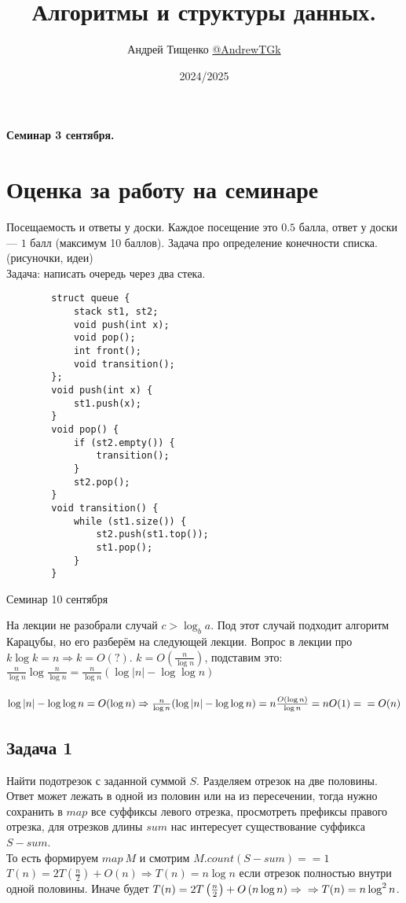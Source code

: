 \documentclass[12pt, a4paper]{article}
\title{Алгоритмы и структуры данных.}
\author{Андрей Тищенко \href{https://t.me/AndrewTGk}{@AndrewTGk}}
\date{2024/2025}
\begin{document}
    \maketitle
    \begin{center}
        \textbf{Семинар 3 сентября.}
    \end{center}
    \section*{Оценка за работу на семинаре}
    Посещаемость и ответы у доски. Каждое посещение это $0.5$ балла, ответ у доски --- $1$ балл (максимум 10 баллов).
    Задача про определение конечности списка. (рисуночки, идеи)\\
    Задача: написать очередь через два стека.
    \begin{lstlisting}
        struct queue {
            stack st1, st2;
            void push(int x);
            void pop();
            int front();
            void transition();
        };
        void push(int x) {
            st1.push(x);
        }
        void pop() {
            if (st2.empty()) {
                transition();
            }
            st2.pop();
        }
        void transition() {
            while (st1.size()) {
                st2.push(st1.top());
                st1.pop();
            }
        }
    \end{lstlisting}
    \begin{center}
        Семинар 10 сентября
    \end{center}
    На лекции не разобрали случай $c > \log_b a$. Под этот случай подходит алгоритм Карацубы, но его 
    разберём на следующей лекции.
    Вопрос в лекции про $k\log k = n\Rightarrow k = O(?)$. $k = O\left(\frac{n}{\log n}\right)$, подставим это:\\
    $\frac{n}{\log n} \log \frac{n}{\log n} = \frac{n}{\log n}(\log |n| - \log\log n)$\\\
    $\log |n| - \log\log n = O(\log n)\Rightarrow \frac{n}{\log n}(\log |n| - \log\log n) = n\frac{O(\log n)}{\log n} = nO(1) =\\
    = O(n)$
    \subsection*{Задача 1}
    Найти подотрезок с заданной суммой $S$. Разделяем отрезок на две половины.\\
    Ответ может лежать в одной из половин или на из пересечении, тогда нужно сохранить в 
    $map$ все суффиксы левого отрезка, просмотреть префиксы правого отрезка, для отрезков длины $sum$
    нас интересует существование суффикса $S - sum$.\\
    То есть формируем $map\ M$ и смотрим $M.count(S - sum) == 1$\\
    $T(n) = 2T\left(\frac{n}{2} \right) + O\left(n\right)\Rightarrow T(n) = n\log n$ если отрезок полностью внутри одной половины.
    Иначе будет $T(n) = 2T\left(\frac{n}{2} \right) + O\left(n\log n\right)\Rightarrow\\
    \Rightarrow  T(n) = n\log^2 n$.
\end{document}
